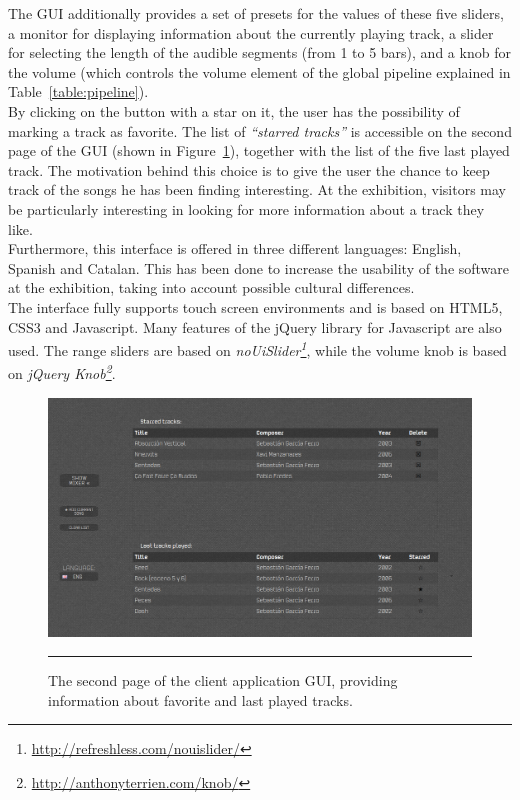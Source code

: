 The GUI additionally provides a set of presets for the values of these five sliders, a monitor for displaying information about the currently playing track, a slider for selecting the length of the audible segments (from 1 to 5 bars), and a knob for the volume (which controls the volume element of the global pipeline explained in Table~\ref{table:pipeline}). \\ By clicking on the button with a star on it, the user has the possibility of marking a track as favorite. The list of \textit{``starred tracks''} is accessible on the second page of the GUI (shown in Figure~\ref{fig:gui2}), together with the list of the five last played track. The motivation behind this choice is to give the user the chance to keep track of the songs he has been finding interesting. At the exhibition, visitors may be particularly interesting in looking for more information about a track they like. \\ 
Furthermore, this interface is offered in three different languages: English, Spanish and Catalan. This has been done to increase the usability of the software at the exhibition, taking into account possible cultural differences. \\
The interface fully supports touch screen environments and is based on HTML5, CSS3 and Javascript. Many features of the jQuery library for Javascript are also used. The range sliders are based on \textit{noUiSlider\footnote{\url{http://refreshless.com/nouislider/}}}, while the volume knob is based on \textit{jQuery Knob\footnote{\url{http://anthonyterrien.com/knob/}}}.
\begin{figure}
\hskip -0.8cm
\includegraphics[scale=0.34]{Figures/gui2.png}
    \rule{27em}{0.5pt}
  \caption[The second page of the user interface]{The second page of the client application GUI, providing information about favorite and last played tracks.}
  \label{fig:gui2}
\end{figure}
